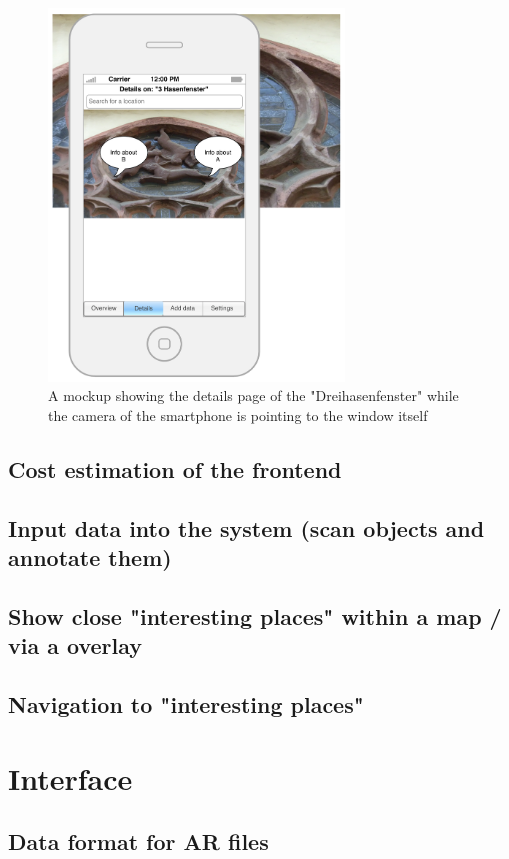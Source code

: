 \begin{figure}[th]
\centerline{\includegraphics[width=0.7\textwidth]{gfx/mockup_app_2}}
\caption{A mockup showing the details page of the "Dreihasenfenster" while the camera of the smartphone is pointing to the window itself}
\label{app2}
\end{figure}

\subsection{Cost estimation of the frontend}				
  
\subsection{Input data into the system (scan objects and annotate them)} 

\subsection{Show close "interesting places" within a map /  via a overlay} 

\subsection{Navigation to "interesting places"}
				
\section{Interface}							 

\subsection{Data format for \ac{AR} files}